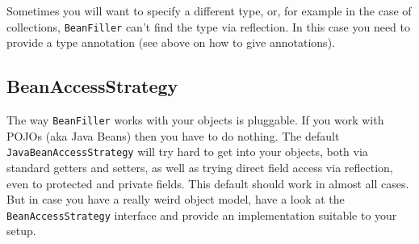 Sometimes you will want to specify a different type, or, for example in the case of collections, \texttt{BeanFiller} can't find the type via reflection. In this case you need to provide a type annotation (see above on how to give annotations).


\subsection{BeanAccessStrategy} %
\label{sub:beanaccessstrategy}

The way \texttt{BeanFiller} works with your objects is pluggable. If you work with POJOs (aka Java Beans) then you have to do nothing. The default \texttt{JavaBeanAccessStrategy} will try hard to get into your objects, both via standard getters and setters, as well as trying direct field access via reflection, even to protected and private fields. This default should work in almost all cases. But in case you have a really weird object model, have a look at the \texttt{BeanAccessStrategy} interface and provide an implementation suitable to your setup.



